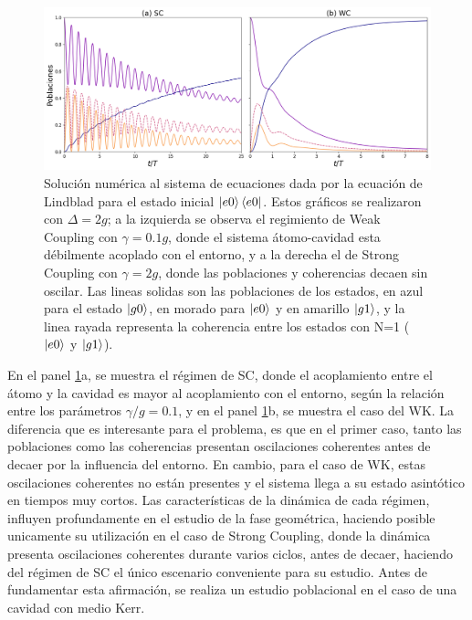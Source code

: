 \begin{figure}[H]
    \centering
    \includegraphics[width=\textwidth]{figuras/ch3/poblaciones sc vs wc.png}
    \caption{Solución numérica al sistema de ecuaciones dada por la ecuación de Lindblad para el estado inicial $\ket{e0}\bra{e0}$. Estos gráficos se realizaron con $\Delta=2g$; a la izquierda se observa el regimiento de Weak Coupling con $\gamma=0.1g$, donde el sistema átomo-cavidad esta débilmente acoplado con el entorno, y a la derecha el de Strong Coupling con $\gamma=2g$, donde las poblaciones y coherencias decaen sin oscilar. Las lineas solidas son las poblaciones de los estados, en azul para el estado $\ket{g0}$, en morado para $\ket{e0}$ y en amarillo $\ket{g1}$, y la linea rayada representa la coherencia entre los estados con N=1 ($\ket{e0}$ y $\ket{g1}$). }
    \label{fig3:poblaciones e0}
\end{figure}

En el panel \ref{fig3:poblaciones e0}a, se muestra el régimen de SC, donde el acoplamiento entre el átomo y la cavidad es mayor al acoplamiento con el entorno, según la relación entre los parámetros $\gamma/g=0.1$, y en el panel \ref{fig3:poblaciones e0}b, se muestra el caso del WK. La diferencia que es interesante para el problema, es que en el primer caso, tanto las poblaciones como las coherencias presentan oscilaciones coherentes antes de decaer por la influencia del entorno. En cambio, para el caso de WK, estas oscilaciones coherentes no están presentes y el sistema llega a su estado asintótico en tiempos muy cortos. Las características de la dinámica de cada régimen, influyen profundamente en el estudio de la fase geométrica, haciendo posible unicamente su utilización en el caso de Strong Coupling, donde la dinámica presenta oscilaciones coherentes durante varios ciclos, antes de decaer, haciendo del régimen de SC el único escenario conveniente para su estudio. Antes de fundamentar esta afirmación, se realiza un estudio poblacional en el caso de una cavidad con medio Kerr.

